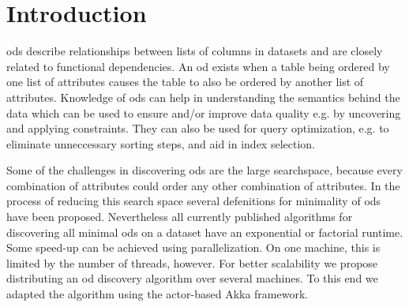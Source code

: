 
\section{Introduction}\label{sec:intro}
\glspl{od} describe relationships between lists of columns in datasets and are closely related to functional dependencies. 
An \gls{od} exists when a table being ordered by one list of attributes causes the table to also be ordered by another list of attributes.
Knowledge of \glspl{od} can help in understanding the semantics behind the data which can be used to ensure and/or improve data quality e.g. by uncovering and applying constraints.
They can also be used for query optimization, e.g. to eliminate unneccessary sorting steps, and aid in index selection.

Some of the challenges in discovering \glspl{od} are the large searchspace, because every combination of attributes could order any other combination of attributes. 
In the process of reducing this search space several defenitions for minimality of \glspl{od} have been proposed. 
Nevertheless all currently published algorithms for discovering all minimal \glspl{od} on a dataset have an exponential or factorial runtime. 
Some speed-up can be achieved using parallelization. 
On one machine, this is limited by the number of threads, however.
For better scalability we propose distributing an \gls{od} discovery algorithm over several machines.
To this end we adapted the algorithm \ocddiscover{} using the actor-based Akka framework.

